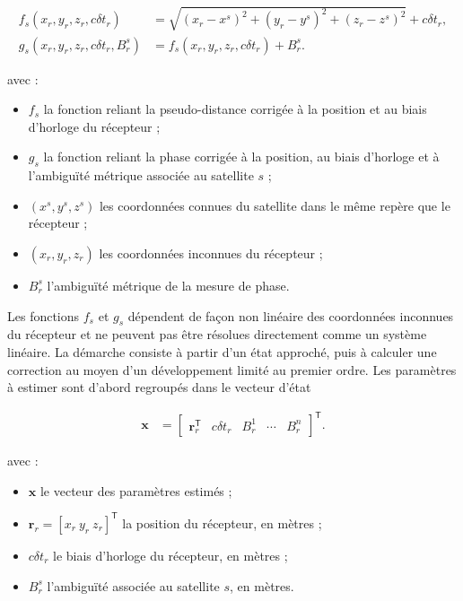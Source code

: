 \begin{align}
f_s(x_r,y_r,z_r,c\delta t_r)
&=
\sqrt{(x_r-x^s)^2+(y_r-y^s)^2+(z_r-z^s)^2}
+c\delta t_r,
\label{ann:eq:code_observation_function}
\\
g_s(x_r,y_r,z_r,c\delta t_r,B_r^s)
&=
f_s(x_r,y_r,z_r,c\delta t_r)+B_r^s.
\label{ann:eq:phase_observation_function}
\end{align}

avec :

\begin{itemize}
    \item $f_s$ la fonction reliant la pseudo-distance corrigée à la position et au biais d'horloge du récepteur ;
    \item $g_s$ la fonction reliant la phase corrigée à la position, au biais d'horloge et à l'ambiguïté métrique associée au satellite $s$ ;
    \item $(x^s,y^s,z^s)$ les coordonnées connues du satellite dans le même
    repère que le récepteur ;
    \item $(x_r,y_r,z_r)$ les coordonnées inconnues du récepteur ;
    \item $B_r^s$ l'ambiguïté métrique de la mesure de phase.
\end{itemize}


Les fonctions $f_s$ et $g_s$ dépendent de façon non linéaire des
coordonnées inconnues du récepteur et ne peuvent pas être résolues directement
comme un système linéaire. La démarche consiste à partir d'un état approché,
puis à calculer une correction au moyen d'un développement limité au premier
ordre. Les paramètres à estimer sont d'abord regroupés dans le vecteur d'état

\begin{align}
\mathbf x
&=
\begin{bmatrix}
\mathbf r_r^{\mathsf T} & c\delta t_r & B_r^1 & \cdots & B_r^n
\end{bmatrix}^{\mathsf T}.
\label{ann:eq:static_state_vector}
\end{align}

avec :

\begin{itemize}
    \item $\mathbf x$ le vecteur des paramètres estimés ;
    \item $\mathbf r_r=[x_r\ y_r\ z_r]^{\mathsf T}$ la position du
    récepteur, en mètres ;
    \item $c\delta t_r$ le biais d'horloge du récepteur, en mètres ;
    \item $B_r^s$ l'ambiguïté associée au satellite $s$, en mètres.
\end{itemize}


